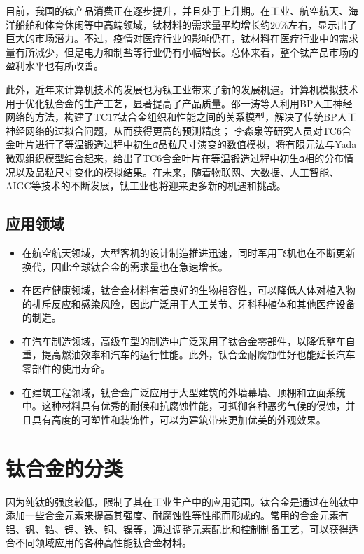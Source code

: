 目前，我国的钛产品消费正在逐步提升，并且处于上升期。在工业、航空航天、海洋船舶和体育休闲等中高端领域，钛材料的需求量平均增长约$ 20\% $左右，显示出了巨大的市场潜力。不过，疫情对医疗行业的影响仍在，钛材料在医疗行业中的需求量有所减少，但是电力和制盐等行业仍有小幅增长。总体来看，整个钛产品市场的盈利水平也有所改善\cite{BJKY202204004}。

此外，近年来计算机技术的发展也为钛工业带来了新的发展机遇。计算机模拟技术用于优化钛合金的生产工艺，显著提高了产品质量。邵一涛等人利用BP人工神经网络的方法，构建了TC17钛合金组织和性能之间的关系模型，解决了传统BP人工神经网络的过拟合问题，从而获得更高的预测精度\cite{BP}；%
李淼泉等研究人员对TC6合金叶片进行了等温锻造过程中初生𝛼晶粒尺寸演变的数值模拟\cite{Moni}，将有限元法与Yada微观组织模型结合起来，给出了TC6合金叶片在等温锻造过程中初生𝛼相的分布情况以及晶粒尺寸变化的模拟结果。在未来，随着物联网、大数据、人工智能、AIGC等技术的不断发展，钛工业也将迎来更多新的机遇和挑战。
\subsection{应用领域}

\begin{itemize}
\item  在航空航天领域，大型客机的设计制造推进迅速，同时军用飞机也在不断更新换代，因此全球钛合金的需求量也在急速增长。
\item  在医疗健康领域，钛合金材料有着良好的生物相容性，可以降低人体对植入物的排斥反应和感染风险，因此广泛用于人工关节、牙科种植体和其他医疗设备的制造。
\item  在汽车制造领域，高级车型的制造中广泛采用了钛合金零部件，以降低整车自重，提高燃油效率和汽车的运行性能。此外，钛合金耐腐蚀性好也能延长汽车零部件的使用寿命。
\item  在建筑工程领域，钛合金广泛应用于大型建筑的外墙幕墙、顶棚和立面系统中。这种材料具有优秀的耐候和抗腐蚀性能，可抵御各种恶劣气候的侵蚀，并且具有高度的可塑性和装饰性，可以为建筑带来更加优美的外观效果。

\end{itemize}
\section{钛合金的分类}
\label{sec:1.1}
因为纯钛的强度较低，限制了其在工业生产中的应用范围。钛合金是通过在纯钛中添加一些合金元素来提高其强度、耐腐蚀性等性能而形成的。常用的合金元素有铝、钒、锆、锂、铁、铜、镍等，通过调整元素配比和控制制备工艺，可以获得适合不同领域应用的各种高性能钛合金材料。

